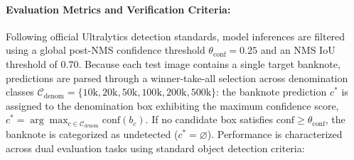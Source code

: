 \documentclass[final,5p,times,twocolumn,authoryear]{elsarticle}
\begin{document}
\paragraph{Evaluation Metrics and Verification Criteria:}
Following official Ultralytics detection standards, model inferences are filtered using a global post-NMS confidence threshold $\theta_{\text{conf}} = 0.25$ and an NMS IoU threshold of $0.70$. Because each test image contains a single target banknote, predictions are parsed through a winner-take-all selection across denomination classes $\mathcal{C}_{\text{denom}} = \{10\text{k}, 20\text{k}, 50\text{k}, 100\text{k}, 200\text{k}, 500\text{k}\}$: the banknote prediction $c^*$ is assigned to the denomination box exhibiting the maximum confidence score, $c^* = \arg\max_{c \in \mathcal{C}_{\text{denom}}} \text{conf}(b_c)$. If no candidate box satisfies $\text{conf} \ge \theta_{\text{conf}}$, the banknote is categorized as undetected ($c^* = \varnothing$). Performance is characterized across dual evaluation tasks using standard object detection criteria:
\end{document}
